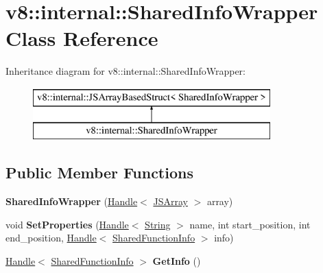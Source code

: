 \hypertarget{classv8_1_1internal_1_1_shared_info_wrapper}{}\section{v8\+:\+:internal\+:\+:Shared\+Info\+Wrapper Class Reference}
\label{classv8_1_1internal_1_1_shared_info_wrapper}
Inheritance diagram for v8\+:\+:internal\+:\+:Shared\+Info\+Wrapper\+:\begin{figure}[H]
\begin{center}
\leavevmode
\includegraphics[height=2.000000cm]{classv8_1_1internal_1_1_shared_info_wrapper}
\end{center}
\end{figure}
\subsection*{Public Member Functions}
\begin{DoxyCompactItemize}
\item 
\hypertarget{classv8_1_1internal_1_1_shared_info_wrapper_a10adf15f4c3fb2c00f4d0f91bf5ee1df}{}{\bfseries Shared\+Info\+Wrapper} (\hyperlink{classv8_1_1internal_1_1_handle}{Handle}$<$ \hyperlink{classv8_1_1internal_1_1_j_s_array}{J\+S\+Array} $>$ array)\label{classv8_1_1internal_1_1_shared_info_wrapper_a10adf15f4c3fb2c00f4d0f91bf5ee1df}

\item 
\hypertarget{classv8_1_1internal_1_1_shared_info_wrapper_a6ec023bc94cfca9b08f39929bd119bd1}{}void {\bfseries Set\+Properties} (\hyperlink{classv8_1_1internal_1_1_handle}{Handle}$<$ \hyperlink{classv8_1_1internal_1_1_string}{String} $>$ name, int start\+\_\+position, int end\+\_\+position, \hyperlink{classv8_1_1internal_1_1_handle}{Handle}$<$ \hyperlink{classv8_1_1internal_1_1_shared_function_info}{Shared\+Function\+Info} $>$ info)\label{classv8_1_1internal_1_1_shared_info_wrapper_a6ec023bc94cfca9b08f39929bd119bd1}

\item 
\hypertarget{classv8_1_1internal_1_1_shared_info_wrapper_a1ffa193b4aca8e123f682a2b6001f012}{}\hyperlink{classv8_1_1internal_1_1_handle}{Handle}$<$ \hyperlink{classv8_1_1internal_1_1_shared_function_info}{Shared\+Function\+Info} $>$ {\bfseries Get\+Info} ()\label{classv8_1_1internal_1_1_shared_info_wrapper_a1ffa193b4aca8e123f682a2b6001f012}

\end{DoxyCompactItemize}
